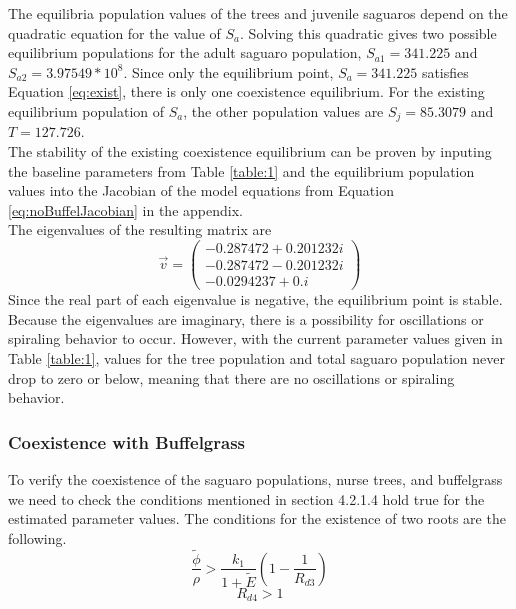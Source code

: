 \documentclass[a4paper]{article}
\begin{document}
The equilibria population values of the trees and juvenile saguaros depend on the quadratic equation for the value of $S_a$. Solving this quadratic gives two possible equilibrium populations for the adult saguaro population, $S_{a1} = 341.225$ and $S_{a2} = 3.97549*10^8$. Since only the equilibrium point, $S_a = 341.225$ satisfies Equation \ref{eq:exist}, there is only one coexistence equilibrium. For the existing equilibrium population of $S_a$, the other population values are $S_j = 85.3079$ and $T = 127.726$.\\

The stability of the existing coexistence equilibrium can be proven by inputing the baseline parameters from Table \ref{table:1} and the equilibrium population values into the Jacobian of the model equations from Equation \ref{eq:noBuffelJacobian} in the appendix.\\

The eigenvalues of the resulting matrix are 
$$\vec{v} = \begin{pmatrix}
-0.287472 + 0.201232i\\
-0.287472 - 0.201232i\\
-0.0294237 + 0.i
\end{pmatrix}$$ 
Since the real part of each eigenvalue is negative, the equilibrium point is stable. Because the eigenvalues are imaginary, there is a possibility for oscillations or spiraling behavior to occur. However, with the current parameter values given in Table \ref{table:1}, values for the tree population and total saguaro population never drop to zero or below, meaning that there are no oscillations or spiraling behavior.
\subsubsection{Coexistence with Buffelgrass}
To verify the coexistence of the saguaro populations, nurse trees, and buffelgrass we need to check the conditions mentioned in section 4.2.1.4 hold true for the estimated parameter values. The conditions for the existence of two roots are the following.
\begin{equation*}
\displaystyle\frac{\tilde{\phi}}{\rho}>\displaystyle\frac{k_1}{1+\tilde{E}}\left(1-\displaystyle\frac{1}{R_{d3}}\right)
\end{equation*}
\begin{equation*}
R_{d4} > 1
\end{equation*}
\end{document}
